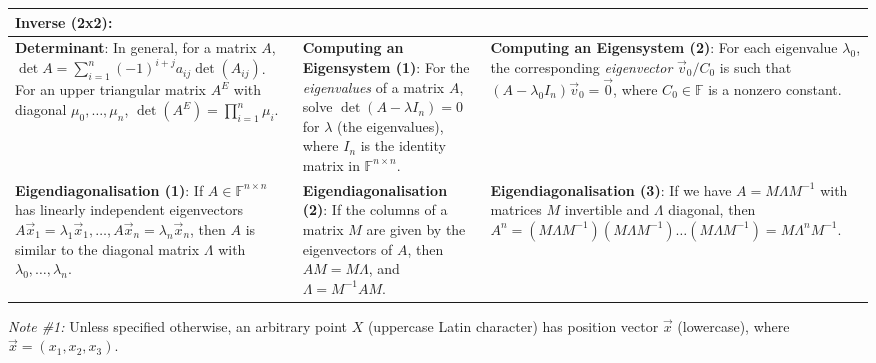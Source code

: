 \begin{tabular}{|m{.31\linewidth}|m{.31\linewidth}|m{.31\linewidth}|}
\textbf{Inverse (2x2)}:
    \smash{$\displaystyle
        A = \begin{pmatrix}
            a & b \\
            c & d
        \end{pmatrix},\,
        A^{-1} = \frac{1}{\det A}
        \begin{pmatrix}
            d & -b \\
            -c & a
        \end{pmatrix}
    $} \\

\hline

\textbf{Determinant}:
    In general, for a matrix $ A $, $ \det A = \sum_{i=1}^n (-1)^{i+j} a_{ij}
    \det(A_{ij}) $. For an upper triangular matrix $ A^E $ with diagonal $
    \mu_0, \ldots, \mu_n $, $ \det\left(A^E\right) = \prod_{i=1}^n \mu_i $. &

\textbf{Computing an Eigensystem (1)}:
    For the \emph{eigenvalues} of a matrix $ A $, solve $ \det(A-\lambda
    I_n) = 0 $ for $ \lambda $ (the eigenvalues), where $ I_n $ is the identity
    matrix in $ \mathbb{F}^{n \times n} $. &

\textbf{Computing an Eigensystem (2)}:
    For each eigenvalue $ \lambda_0 $, the corresponding \emph{eigenvector} $
    \vec{v}_0/C_0 $ is such that $ (A - \lambda_0 I_n) \vec{v}_0 = \vec{0} $,
    where $ C_0 \in \mathbb{F} $ is a nonzero constant. \\

\hline

\textbf{Eigendiagonalisation (1)}:
    If $ A \in \mathbb{F}^{n \times n} $ has linearly independent eigenvectors $
    A\vec{x}_1 = \lambda_1\vec{x}_1, \ldots, A\vec{x}_n = \lambda_n\vec{x}_n $,
    then $ A $ is similar to the diagonal matrix $ \Lambda $ with $ \lambda_0,
    \ldots, \lambda_n $. &

\textbf{Eigendiagonalisation (2)}:
    If the columns of a matrix $ M $ are given by the eigenvectors of $ A $,
    then $ AM = M\Lambda $, and $ \Lambda = M^{-1}AM $. &

\textbf{Eigendiagonalisation (3)}:
    If we have $ A = M \Lambda M^{-1} $ with matrices $ M $ invertible and $
    \Lambda $ diagonal, then $ A^n = (M \Lambda M^{-1})(M \Lambda M^{-1}) \ldots
    (M \Lambda M^{-1}) = M \Lambda^n M^{-1} $. \\

\hline
\end{tabular}

\vfill
\emph{Note \#1:} Unless specified otherwise, an arbitrary point $ X $ (uppercase
Latin character) has position vector $ \vec{x} $ (lowercase), where $ \vec{x} =
(x_1, x_2, x_3) $.
\vfill


